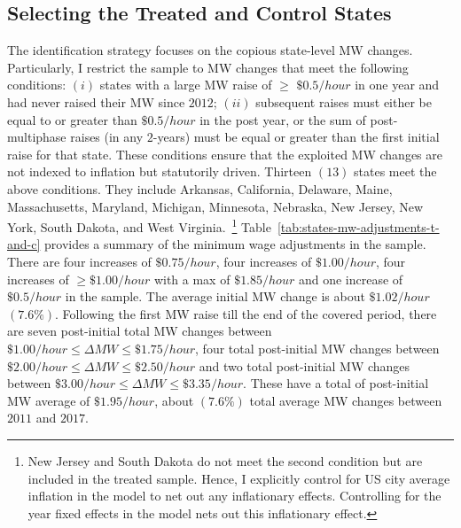 \documentclass[12pt, english]{article}
\begin{document}
    \subsection{Selecting the Treated and Control States}\label{subsec:selecting-the-treated-and-control-states}
    The identification strategy focuses on the copious state-level MW changes. Particularly, I restrict the sample to MW changes that meet the following conditions: $(i)$ states with a large MW raise of $\geq$ $\$0.5/hour$ in one year and had never raised their MW since $2012$; $(ii)$ subsequent raises must either be equal to or greater than $\$0.5/hour$ in the post year, or the sum of post-multiphase raises (in any $2$-years) must be equal or greater than the first initial raise for that state. These conditions ensure that the exploited MW changes are not indexed to inflation but statutorily driven. Thirteen $(13)$ states meet the above conditions. They include Arkansas, California, Delaware, Maine, Massachusetts, Maryland, Michigan, Minnesota, Nebraska, New Jersey, New York, South Dakota, and West Virginia.~\footnote{\tiny New Jersey and South Dakota do not meet the second condition but are included in the treated sample. Hence, I explicitly control for US city average inflation in the model to net out any inflationary effects. Controlling for the year fixed effects in the model nets out this inflationary effect.} Table~\ref{tab:states-mw-adjustments-t-and-c} provides a summary of the minimum wage adjustments in the sample. There are four increases of $\$0.75/hour$, four increases of $\$1.00/hour$, four increases of $\geq \$1.00/hour$ with a max of $\$1.85/hour$ and one increase of $\$0.5/hour$ in the sample. The average initial MW change is about $\$1.02/hour$ $(7.6\%)$. Following the first MW raise till the end of the covered period, there are seven post-initial total MW changes between $\$1.00/hour \leq \Delta MW \leq \$1.75/hour$, four total post-initial MW changes between $\$2.00/hour \leq \Delta MW \leq \$2.50/hour$ and two total post-initial MW changes between $\$3.00/hour \leq \Delta MW \leq \$3.35/hour$. These have a total of post-initial MW average of $\$1.95/hour$, about $(7.6\%)$ total average MW changes between $2011$ and $2017$.
    
\end{document}
